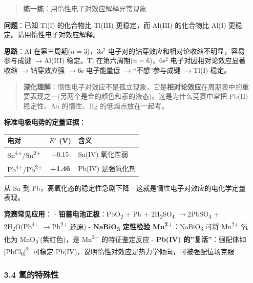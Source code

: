 \documentclass[a4paper,11pt]{ctexart}
\newcounter{none}
\newcommand{\箭}{\ensuremath{\rightarrow}}
\newcommand{\左箭}{\ensuremath{\leftarrow}}
\newcommand{\上箭}{\ensuremath{\uparrow}}
\newcommand{\下箭}{\ensuremath{\downarrow}}
\newcommand{\衡}{\ensuremath{\rightleftharpoons}}
\newcommand{\双箭}{\ensuremath{\leftrightarrow}}
\newcommand{\约等于}{\ensuremath{\approx}}
\newcommand{\小于等于}{\ensuremath{\leq}}
\newcommand{\大于等于}{\ensuremath{\geq}}
\newcommand{\不等于}{\ensuremath{\neq}}
\newcommand{\西格马}{\ensuremath{\sigma}}
\newcommand{\派}{\ensuremath{\pi}}
\begin{document}
\begin{quote}
\textbf{练一练}：用惰性电子对效应解释异常现象
\end{quote}

\textbf{问题}：已知 Tl(I) 的化合物比 Tl(III) 更稳定，而 Al(III) 的化合物比 Al(I) 更稳定。请用惰性电子对效应解释。

\textbf{思路}：Al 在第三周期(\(n=3\))，\(3\mathrm{s}^2\) 电子对的钻穿效应和相对论收缩不明显，容易参与成键 \箭 Al(III) 稳定。Tl 在第六周期(\(n=6\))，\(6\mathrm{s}^2\) 电子对因相对论效应显著收缩 \箭 钻穿效应强 \箭 6s 电子能量低 \箭 ``不想''参与成键 \箭 Tl(I) 稳定。

\begin{quote}
\textbf{深化理解}：惰性电子对效应不是孤立现象，它是\textbf{相对论效应}在周期表中的重要表现之一(另两个是金的颜色和汞的液态)。这是为什么竞赛中常把 Pb(II) 稳定性、Au 的惰性、Hg 的低熔点放在一起考。
\end{quote}

\textbf{标准电极电势的定量证据}：

{\def\LTcaptype{none} %
\begin{longtable}[]{@{}lcl@{}}
\toprule\noalign{}
电对 & \(E^\circ\) (V) & 含义 \\
\midrule\noalign{}
\endhead
\bottomrule\noalign{}
\endlastfoot
Sn\textsuperscript{4+}/Sn\textsuperscript{2+} & +0.15 & Sn(IV) 氧化性弱 \\
Pb\textsuperscript{4+}/Pb\textsuperscript{2+} & \textbf{+1.46} & Pb(IV) 是强氧化剂 \\
\end{longtable}
}

从 Sn 到 Pb，高氧化态的稳定性急剧下降---这就是惰性电子对效应的电化学定量表现。

\textbf{竞赛常见应用}：
- \textbf{铅蓄电池正极}：PbO\textsubscript{2} + Pb + 2H\textsubscript{2}SO\textsubscript{4} \箭 2PbSO\textsubscript{4} + 2H\textsubscript{2}O(Pb\textsuperscript{4+} \箭 Pb\textsuperscript{2+} 还原)
- \textbf{NaBiO\textsubscript{3} 定性检验 Mn\textsuperscript{2+}}：NaBiO\textsubscript{3} 可将 Mn\textsuperscript{2+} 氧化为 MnO\textsubscript{4}\textsuperscript{-}(紫红色)，是 Mn\textsuperscript{2+} 的特征鉴定反应
- \textbf{Pb(IV) 的''复活''}：强配体如 {[}PbCl\textsubscript{6}{]}\textsuperscript{2-} 可稳定 Pb(IV)，说明惰性对效应是热力学倾向，可被强配位场克服

\subsubsection{3.4 氢的特殊性}\label{ux6c22ux7684ux7279ux6b8aux6027}
\end{document}

